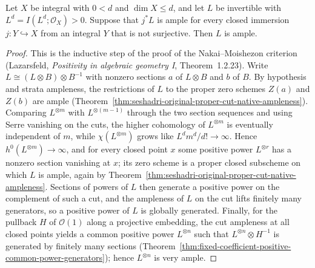 \begin{theorem}
\label{thm:seshadri-integral-ampleness-step}
\leanok
{}
Let $X$ be integral with $0<d$ and $\dim X\le d$, and let $L$ be invertible with
$L^d=I(L^d;\mathcal O_X)>0$. Suppose that $j^*L$ is ample for every closed immersion
$j:Y\hookrightarrow X$ from an integral $Y$ that is not surjective. Then $L$ is ample.
\end{theorem}
\begin{proof}
This is the inductive step of the proof of the Nakai--Moishezon criterion
(Lazarsfeld, \emph{Positivity in algebraic geometry I}, Theorem~1.2.23). Write
$L\cong(L\otimes B)\otimes B^{-1}$ with nonzero sections $a$ of $L\otimes B$ and $b$ of $B$.
By hypothesis and strata ampleness, the restrictions of $L$ to the proper zero schemes
$Z(a)$ and $Z(b)$ are ample (Theorem~\ref{thm:seshadri-original-proper-cut-native-ampleness}).
Comparing $L^{\otimes m}$ with $L^{\otimes(m-1)}$ through the two section sequences and using
Serre vanishing on the cuts, the higher cohomology of $L^{\otimes m}$ is eventually
independent of $m$, while $\chi(L^{\otimes m})$ grows like $L^d m^d/d!\to\infty$. Hence
$h^0(L^{\otimes m})\to\infty$, and for every closed point $x$ some positive power
$L^{\otimes r}$ has a nonzero section vanishing at $x$; its zero scheme is a proper closed
subscheme on which $L$ is ample, again by
Theorem~\ref{thm:seshadri-original-proper-cut-native-ampleness}. Sections of powers of $L$
then generate a positive power on the complement of such a cut, and the ampleness of $L$ on
the cut lifts finitely many generators, so a positive power of $L$ is globally generated.
Finally, for the pullback $H$ of $\mathcal O(1)$ along a projective embedding, the cut
ampleness at all closed points yields a common positive power $L^{\otimes n}$ such that
$L^{\otimes n}\otimes H^{-1}$ is generated by finitely many sections
(Theorem~\ref{thm:fixed-coefficient-positive-common-power-generators}); hence
$L^{\otimes n}$ is very ample.
\end{proof}

